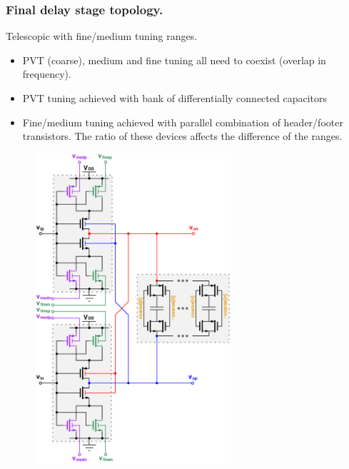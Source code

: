 \documentclass[t, screen, aspectratio=43]{beamer}
\begin{document}
\begin{frame}
	\frametitle{Final delay stage topology.}
	\begin{block}{Telescopic with fine/medium tuning ranges.}
		\begin{minipage}{6cm}
			\vspace{1em}
			\tiny

			\begin{itemize}[itemsep=4pt,label=\protect---]
				\item PVT (coarse), medium and fine tuning all need to coexist (overlap in frequency).
				\item PVT tuning achieved with bank of differentially connected capacitors
				\item Fine/medium tuning achieved with parallel combination of header/footer transistors. The ratio of these devices affects the difference of the ranges.

			\end{itemize}

		\end{minipage}%
		\begin{minipage}{6cm}
			\begin{figure}[htb!]
			        \centering
			        \includegraphics[width=0.65\textwidth, angle=0]{telescopic_pseudodiff_delay_cell_all_tune}
			\end{figure}
		\end{minipage}%

	\end{block}	
\end{frame}
\end{document}
